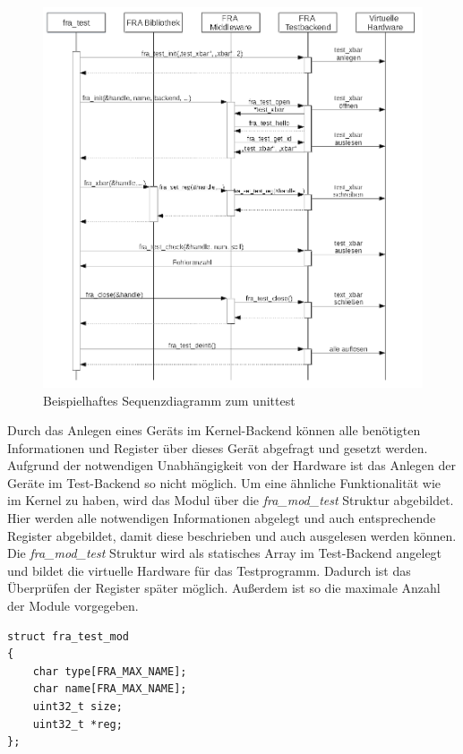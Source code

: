 \begin{figure}[!hbtp]
	\centering
	\includegraphics[width = \linewidth]{pictures/2019-11-28-testbackend.png}
	\smallskip
	\caption{Beispielhaftes Sequenzdiagramm zum \gls{unittest}}
	\label{fig:testbackend}
\end{figure} 


Durch das Anlegen eines Geräts im Kernel-Backend können alle benötigten Informationen und Register über dieses Gerät abgefragt und gesetzt werden. Aufgrund der notwendigen Unabhängigkeit von der Hardware ist das Anlegen der Geräte im Test-Backend so nicht möglich. Um eine ähnliche Funktionalität wie im Kernel zu haben, wird das Modul über die \textit{fra\_mod\_test} Struktur abgebildet. Hier werden alle notwendigen Informationen abgelegt und auch entsprechende Register abgebildet, damit diese beschrieben und auch ausgelesen werden können.
Die \textit{fra\_mod\_test} Struktur wird als statisches Array im Test-Backend angelegt und bildet die virtuelle Hardware für das Testprogramm. Dadurch ist das Überprüfen der Register später möglich. Außerdem ist so die maximale Anzahl der Module vorgegeben. 


\begin{lstfloat}
\begin{lstlisting}
struct fra_test_mod
{
	char type[FRA_MAX_NAME];
	char name[FRA_MAX_NAME];
	uint32_t size;
	uint32_t *reg;
};
\end{lstlisting}
\end{lstfloat}

